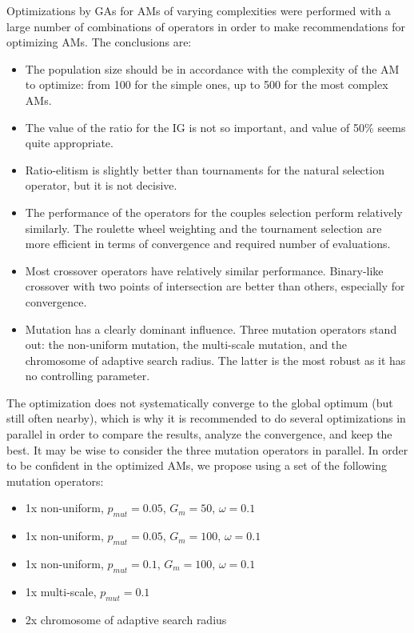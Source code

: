 \documentclass{ametsoc}
\begin{document}
Optimizations by GAs for AMs of varying complexities were performed with a large number of combinations of operators in order to make recommendations for optimizing AMs. The conclusions are:

\begin{itemize}
	\item The population size should be in accordance with the complexity of the AM to optimize: from 100 for the simple ones, up to 500 for the most complex AMs.
	
	\item The value of the ratio for the IG is not so important, and value of 50\% seems quite appropriate.
	
	\item Ratio-elitism is slightly better than tournaments for the natural selection operator, but it is not decisive.
	
	\item The performance of the operators for the couples selection perform relatively similarly. The roulette wheel weighting and the tournament selection are more efficient in terms of convergence and required number of evaluations.
	
	\item Most crossover operators have relatively similar performance. Binary-like crossover with two points of intersection are better than others, especially for convergence.
	
	\item Mutation has a clearly dominant influence. Three mutation operators stand out: the non-uniform mutation, the multi-scale mutation, and the chromosome of adaptive search radius. The latter is the most robust as it has no controlling parameter.
	
\end{itemize}

The optimization does not systematically converge to the global optimum (but still often nearby), which is why it is recommended to do several optimizations in parallel in order to compare the results, analyze the convergence, and keep the best. It may be wise to consider the three mutation operators in parallel. In order to be confident in the optimized AMs, we propose using a set of the following mutation operators:

\begin{itemize}
	\setlength\itemsep{-4px}
	\item 1x non-uniform, $p_{mut}=0.05$, $G_{m}=50$, $\omega=0.1$
	\item 1x non-uniform, $p_{mut}=0.05$, $G_{m}=100$, $\omega=0.1$
	\item 1x non-uniform, $p_{mut}=0.1$, $G_{m}=100$, $\omega=0.1$
	\item 1x multi-scale,  $p_{mut}=0.1$
	\item 2x chromosome of adaptive search radius
\end{itemize}
\end{document}
